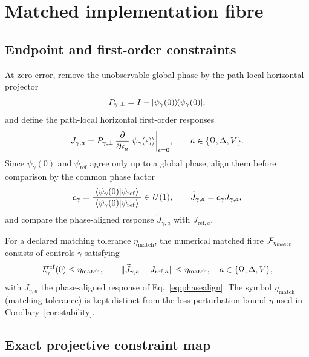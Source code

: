 \section{Matched implementation fibre}\label{sec:fibre}

\subsection{Endpoint and first-order constraints}

At zero error, remove the unobservable global phase by the path-local horizontal projector
\[
P_{\gamma,\perp}=I-\lvert \psi_{\gamma}(0) \rangle\!\langle \psi_{\gamma}(0) \rvert,
\]
and define the path-local horizontal first-order responses
\begin{equation}\label{eq:jresponse}
J_{\gamma,a}=P_{\gamma,\perp}\,
\frac{\partial}{\partial\epsilon_{a}}\lvert \psi_{\gamma}(\epsilon) \rangle\bigg|_{\epsilon=0},
\qquad a\in\{\Omega,\Delta,V\}.
\end{equation}
Since $\psi_{\gamma}(0)$ and $\psi_{\mathrm{ref}}$ agree only up to a global phase, align
them before comparison by the common phase factor
\begin{equation}\label{eq:phasealign}
c_{\gamma}=\frac{\langle \psi_{\gamma}(0) \vert \psi_{\mathrm{ref}} \rangle}
{\lvert\langle \psi_{\gamma}(0) \vert \psi_{\mathrm{ref}} \rangle\rvert}\in U(1),
\qquad \widetilde{J}_{\gamma,a}=c_{\gamma}J_{\gamma,a},
\end{equation}
and compare the phase-aligned response $\widetilde{J}_{\gamma,a}$ with
$J_{\mathrm{ref},a}$.

\begin{definition}\label{def:fibre}
For a declared matching tolerance $\eta_{\mathrm{match}}$, the numerical matched fibre
$\mathcal{F}_{\eta_{\mathrm{match}}}$ consists of controls $\gamma$ satisfying
\begin{equation}\label{eq:fibre}
\mathcal{I}^{\mathrm{ref}}_{\gamma}(0)\le\eta_{\mathrm{match}},\qquad
\lVert \widetilde{J}_{\gamma,a}-J_{\mathrm{ref},a}\rVert\le\eta_{\mathrm{match}},
\quad a\in\{\Omega,\Delta,V\},
\end{equation}
with $\widetilde{J}_{\gamma,a}$ the phase-aligned response of Eq.~\eqref{eq:phasealign}.
The symbol $\eta_{\mathrm{match}}$ (matching tolerance) is kept distinct from the loss
perturbation bound $\eta$ used in Corollary~\ref{cor:stability}.
\end{definition}

\subsection{Exact projective constraint map}

